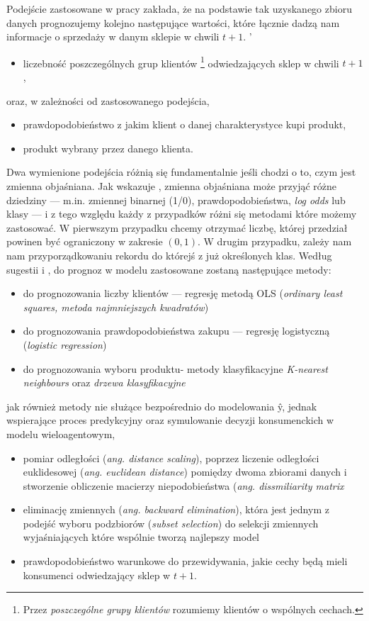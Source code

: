 \documentclass[polish, twoside, 12pt, a4paper]{article}
\theoremstyle{definition}
\theoremstyle{plain}
\theoremstyle{remark}
\begin{document}
Podejście zastosowane w pracy zakłada, że na podstawie tak uzyskanego zbioru danych prognozujemy kolejno następujące wartości, które łącznie dadzą nam informacje o sprzedaży w danym sklepie w chwili $t+1$. 
	'\begin{itemize} 
		\item liczebność poszczególnych grup klientów \footnote{Przez \textit{poszczególne grupy klientów} rozumiemy klientów o wspólnych cechach.} odwiedzających sklep w chwili $t+1$,
	\end{itemize}
	oraz, w zależności od zastosowanego podejścia,
	\begin{itemize} 
		\item prawdopodobieństwo z jakim klient o danej charakterystyce kupi produkt,
		\item produkt wybrany przez danego klienta. 
	\end{itemize}

Dwa wymienione podejścia różnią się fundamentalnie jeśli chodzi o to, czym jest zmienna objaśniana. Jak wskazuje \cite{James2013}, zmienna objaśniana może przyjąć różne dziedziny --- m.in. zmiennej binarnej (1/0), prawdopodobieństwa, \textit{log odds} lub klasy --- i z tego względu każdy z przypadków różni się metodami które możemy zastosować. W pierwszym przypadku chcemy otrzymać liczbę, której przedział powinen być ograniczony w zakresie $(0,1)$. W drugim przypadku, zależy nam nam przyporządkowaniu rekordu do którejś z już określonych klas. Według sugestii \cite{James2013} i \cite{hastie2001}, do prognoz w modelu zastosowane zostaną następujące metody:

	\begin{itemize} 
		\item do prognozowania liczby klientów --- regresję metodą OLS (\textit{ordinary least squares, metoda najmniejszych kwadratów})
		\item do prognozowania prawdopodobieństwa zakupu --- regresję logistyczną (\textit{logistic regression})
		\item do prognozowania wyboru produktu- metody klasyfikacyjne \textit{K-nearest neighbours} oraz \textit{drzewa klasyfikacyjne}
	\end{itemize}
	jak również metody nie służące bezpośrednio do modelowania \^{y}, jednak wspierające proces predykcyjny oraz symulowanie decyzji konsumenckich w modelu wieloagentowym,
	\begin{itemize} 
		\item pomiar odległości (\textit{ang. distance scaling}), poprzez liczenie odległości euklidesowej (\textit{ang. euclidean distance}) pomiędzy dwoma zbiorami danych i stworzenie obliczenie macierzy niepodobieństwa (\textit{ang. dissmiliarity matrix}
		\item eliminację zmiennych (\textit{ang. backward elimination}), która jest jednym z podejść wyboru podzbiorów (\textit{subset selection}) do selekcji zmiennych wyjaśniających które wspólnie tworzą najlepszy model
		\item prawdopodobieństwo warunkowe do przewidywania, jakie cechy będą mieli konsumenci odwiedzający sklep w $t+1$.
	\end{itemize}	
\end{document}
